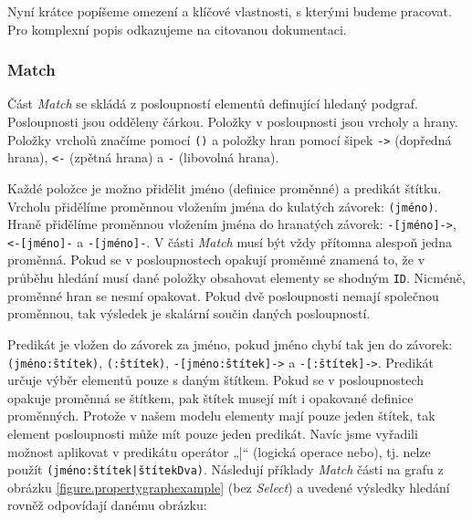 Nyní krátce popíšeme omezení a klíčové vlastnosti, s kterými budeme pracovat.
Pro komplexní popis odkazujeme na citovanou dokumentaci.

\subsubsection{Match}

Část \textit{Match} se skládá z posloupností elementů definující hledaný podgraf.
Posloupnosti jsou odděleny čárkou.
Položky v posloupnosti jsou vrcholy a hrany.
Položky vrcholů značíme pomocí \texttt{()} a položky hran pomocí šipek \texttt{->} (dopředná hrana), \texttt{<-} (zpětná hrana) a \texttt{-} (libovolná hrana).

Každé položce je možno přidělit jméno (definice proměnné) a predikát štítku.
Vrcholu přidělíme proměnnou vložením jména do kulatých závorek: \texttt{(jméno)}.
Hraně přidělíme proměnnou vložením jména do hranatých závorek: \texttt{-[jméno]->}, \texttt{<-[jméno]-} a \texttt{-[jméno]-}.
V části \textit{Match} musí být vždy přítomna alespoň jedna proměnná.
Pokud se v posloupnostech opakují proměnné znamená to, že v průběhu hledání musí dané položky obsahovat elementy se shodným \texttt{ID}.
Nicméně, proměnné hran se nesmí opakovat.
Pokud dvě posloupnosti nemají společnou proměnnou, tak výsledek je skalární součin daných posloupností. 

Predikát je vložen do závorek za jméno, pokud jméno chybí tak jen do závorek: \texttt{(jméno:štítek)}, \texttt{(:štítek)}, \texttt{-[jméno:štítek]->} a \texttt{-[:štítek]->}.
Predikát určuje výběr elementů pouze s daným štítkem.
Pokud se v posloupnostech opakuje proměnná se štítkem, pak štítek musejí mít i opakované definice proměnných.
Protože v našem modelu elementy mají pouze jeden štítek, tak element posloupnosti může mít pouze jeden predikát.
Navíc jsme vyřadili možnost aplikovat v predikátu operátor „|“ (logická operace nebo), tj. nelze použít \texttt{(jméno:štítek|štítekDva)}.
Následují příklady \textit{Match} části na grafu z obrázku \ref{figure.propertygraphexample} (bez \textit{Select}) a uvedené výsledky hledání rovněž odpovídají danému obrázku:

